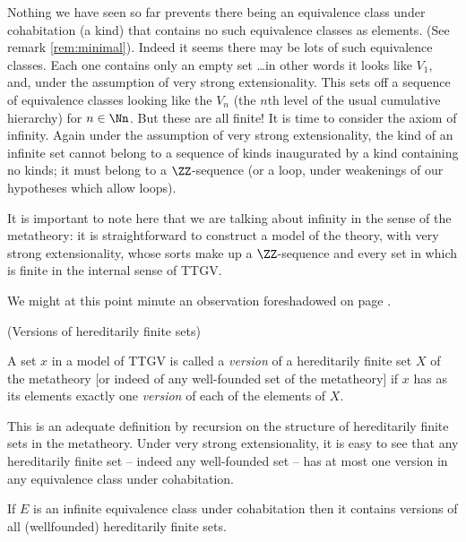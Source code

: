 \documentclass[12pt]{article}
\begin{document}
{Nothing we have seen so far prevents there being an equivalence class under cohabitation (a kind)
that contains no such equivalence classes as elements.  (See remark \ref{rem:minimal}).
Indeed it seems there may be lots of such equivalence classes.  Each
one contains only an empty set \ldots in other words it looks like $V_1$, and, under the assumption of very strong extensionality.
This sets off a sequence of equivalence classes looking like the $V_n$ (the $n$th level of the usual cumulative hierarchy)
for $n \in \Nn$. But these are all finite!  It is time to consider the
axiom of infinity.  Again under the assumption of very strong extensionality, the kind of an infinite set
cannot belong to a sequence of kinds inaugurated by
a kind containing no kinds; it must belong to a $\ZZ$-sequence (or a loop, under weakenings of our hypotheses which allow loops). 

It is important to note here that we are talking about infinity in the sense of the metatheory:  it is straightforward to construct  a model of the theory, with very strong extensionality, whose sorts make up a $\ZZ$-sequence and every set in which is finite in the internal sense of TTGV.

We might at this point minute an observation foreshadowed on page \pageref{lookahead}.

\begin{dfn} (Versions of hereditarily finite sets)

  A set $x$ in a model of TTGV is called a {\em version} of a hereditarily finite set $X$ of the metatheory [or indeed of any well-founded set of the metatheory] if $x$ has as its elements exactly one {\em version} of each of the elements of $X$. \end{dfn}

  This is an adequate definition by recursion on the structure of hereditarily finite sets in the metatheory.  Under very strong extensionality, it is easy to see that any hereditarily finite set -- indeed any well-founded set -- has at most one version in any equivalence class under cohabitation.

\begin{rem}\label{rem:infinite}
If $E$ is an infinite equivalence class under cohabitation then it contains versions of all (wellfounded) hereditarily finite sets.\end{rem}

\Proof

}
\end{document}
